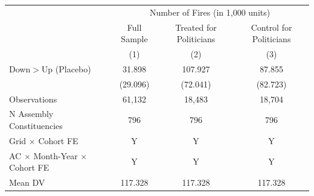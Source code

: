 \begin{tabular}{lccc}
\hline
& \multicolumn{3}{c}{Number of Fires (in 1,000 units)}\\
& Full Sample & Treated for Politicians & Control for Politicians \\
& (1) & (2) & (3) \\
\midrule

Down$>$Up (Placebo)&      31.898         &     107.927         &      87.855         \\
            &    (29.096)         &    (72.041)         &    (82.723)         \\
\hline
Observations&      61,132         &      18,483         &      18,704         \\
N Assembly Constituencies&         796         &         796         &         796         \\
Grid $\times$ Cohort FE&           Y         &           Y         &           Y         \\
AC $\times$ Month-Year $\times$ Cohort FE&           Y         &           Y         &           Y         \\
Mean DV     &     117.328         &     117.328         &     117.328         \\
\hline
\end{tabular}
